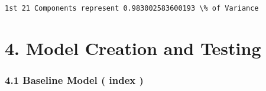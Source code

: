 \documentclass[11pt]{article}
\begin{document}
    \begin{Verbatim}[commandchars=\\\{\}]
1st 21 Components represent 0.983002583600193 \% of Variance
\end{Verbatim}

    \section{\texorpdfstring{ 4. Model Creation and Testing
}{ 4. Model Creation and Testing   }}\label{model-creation-and-testing}

    \subsubsection{\texorpdfstring{ 4.1 Baseline Model ( index
)}{ 4.1 Baseline Model    ( index )}}\label{baseline-model-index}
\end{document}
